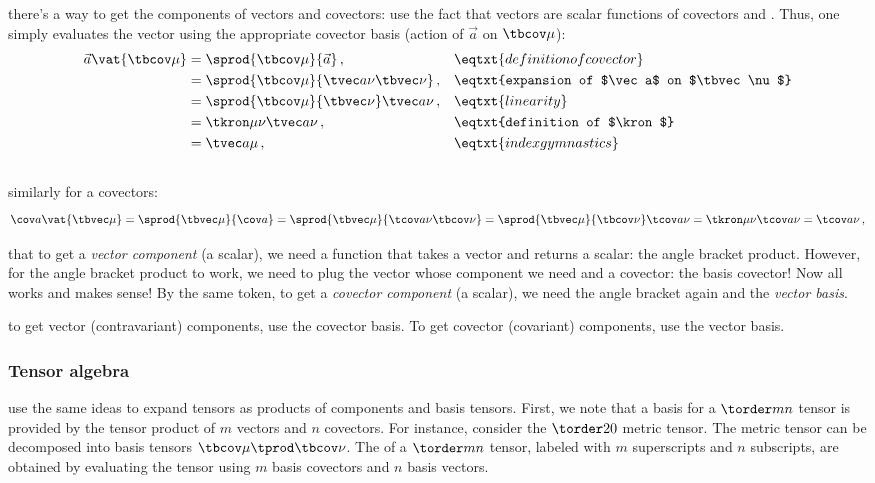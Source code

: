  there's a  way to get the components of vectors and covectors: use the fact that vectors are scalar functions of covectors and \vicvers. Thus, one simply evaluates the vector using the appropriate covector basis (action of $\vec a$ on $\tbcov\mu$):
%
\begin{align}\label{eq:veccomponentsusingcovecbasis}
  \vec a\vat{\tbcov\mu} &= \sprod{\tbcov\mu}{\vec a}               \,,&&\eqtxt{definition of covector}\\\nonumber
                        &= \sprod{\tbcov\mu}{\tvec a\nu\tbvec\nu}  \,,&&\eqtxt{expansion of $\vec a$ on $\tbvec\nu$}\\\nonumber
                        &= \sprod{\tbcov\mu}{\tbvec\nu}\tvec a\nu  \,,&&\eqtxt{linearity}\\\nonumber
                        &= \tkron\mu\nu\tvec a\nu                  \,,&&\eqtxt{definition of $\kron$}\\\nonumber
                        &= \tvec a\mu                              \,,&&\eqtxt{index gymnastics}\\\nonumber
\end{align}
%
similarly for a covectors:
%
\begin{equation}\label{eq:covcomponentsusingvecbasis}
  \cov a\vat{\tbvec\mu} = \sprod{\tbvec\mu}{\cov a}
                        = \sprod{\tbvec\mu}{\tcov a\nu\tbcov\nu}
                        = \sprod{\tbvec\mu}{\tbcov\nu}\tcov a\nu
                        = \tkron\mu\nu\tcov a\nu
                        = \tcov a\nu\,,
\end{equation}

 that to get a \emph{vector component} (a scalar), we need a function that takes a vector and returns a scalar: the angle bracket product. However, for the angle bracket product to work, we need to plug the vector whose component we need and a covector: the basis covector! Now all works and makes sense! By the same token, to get a \emph{covector component} (a scalar), we need the angle bracket again and the \emph{vector basis}.

 to get vector (contravariant) components, use the covector basis. To get covector (covariant) components, use the vector basis.


\subsubsection{Tensor algebra}
%
 use the same ideas to expand tensors as products of components and basis tensors. First, we note that a basis for a $\torder mn$ tensor is provided by the tensor product of $m$ vectors and $n$ covectors. For instance, consider the $\torder 20$ metric tensor. The metric tensor can be decomposed into basis tensors $\tbcov\mu\tprod\tbcov\nu$. The  of a $\torder mn$ tensor, labeled with $m$ superscripts and $n$ subscripts, are obtained by evaluating the tensor using $m$ basis covectors and $n$ basis vectors.

